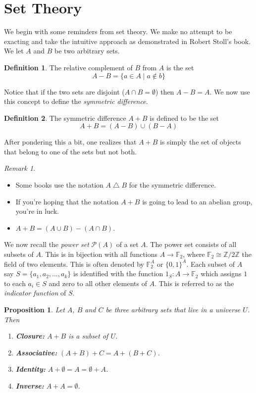 \documentclass[10pt, letterpaper]{article}
\newcommand{\field}[1]{\mathbb{#1}}
\newcommand{\Z}{\mathbb{Z}}
\newtheorem{prop}{Proposition}
\theoremstyle{remark}
\newtheorem{rem}{Remark}
\theoremstyle{definition}
\newtheorem{defn}{Definition}
\begin{document}
\section{Set Theory}

We begin with some reminders from set theory. We make no attempt to be exacting and take the intuitive approach as demonstrated in Robert Stoll's book. We let $A$ and $B$ be two arbitrary sets.

\begin{defn}
	The relative complement of $B$ from $A$ is the set
	\[
		A - B = \{a \in A \mid a \notin b\}
	\]
\end{defn}

Notice that if the two sets are disjoint ($A \cap B = \emptyset$) then $A-B=A$. We now use this concept to define the \textit{symmetric difference}.

\begin{defn}
	The symmetric difference $A + B$ is defined to be the set
	\[
		A + B = (A - B) \cup (B - A)
	\]
\end{defn}

After pondering this a bit, one realizes that $A+B$ is simply the set of objects that belong to one of the sets but not both.

\begin{rem} \leavevmode
	\begin{itemize}
		\item Some books use the notation $A \bigtriangleup B$ for the symmetric difference.
		\item If you're hoping that the notation $A+B$ is going to lead to an abelian group, you're in luck. 
		\item $A+B = (A \cup B) - (A \cap B)$.
	\end{itemize}
\end{rem}

We now recall the \textit{power set} $\mathcal{P}(A)$ of a set $A$. The power set consists of all subsets of $A$. This is in bijection with all functions $A \rightarrow \field{F}_2$, where $\field{F}_2 \cong \Z/2\Z$ the field of two elements. This is often denoted by $\field{F}_2^A$ or $\{0,1\}^A$. Each subset of $A$ say $S=\{a_1, a_2, \ldots, a_k\}$ is identified with the function $1_S: A \rightarrow \field{F}_2$ which assigns $1$ to each $a_i \in S$ and zero to all other elements of $A$. This is referred to as the \textit{indicator function} of $S$.

\begin{prop}
	Let $A$, $B$ and $C$ be three arbitrary sets that live in a universe $U$. Then
	\begin{enumerate}
		\item[(a)] \textbf{Closure: }$A+B$ is a subset of $U$.
		\item[(b)] \textbf{Associative: } $(A+B)+C = A+(B+C)$.
		\item[(c)] \textbf{Identity: } $A + \emptyset = A = \emptyset + A$.
		\item[(d)] \textbf{Inverse: } $A + A = \emptyset$.
	\end{enumerate}
\end{prop}
\end{document}

